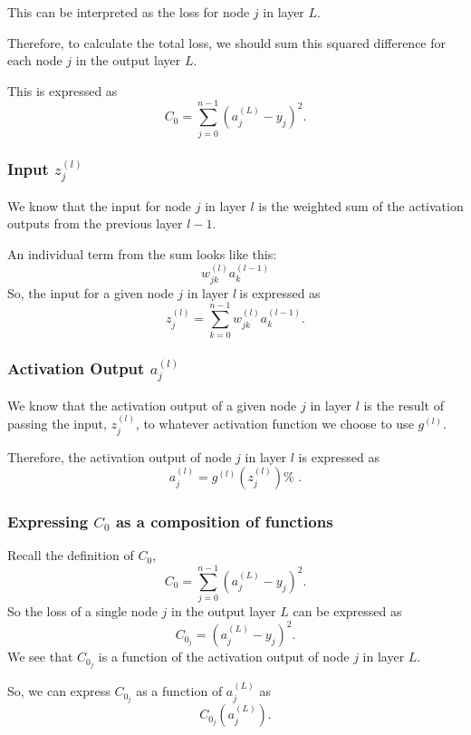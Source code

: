 \documentclass{article}
\begin{document}
This can be interpreted as the loss for node $j$ in layer $L$.

Therefore, to calculate the total loss, we should sum this squared
difference for each node $j$ in the output layer $L$.

This is expressed as%
\[
C_{0}=\sum_{j=0}^{n-1}\left( a_{j}^{(L)}-y_{j}\right) ^{2}\text{.} 
\]

\subsubsection{\protect\vspace{1pt}Input $z_{j}^{(l)}$}

We know that the input for node $j$ in layer $l$ is the weighted sum of the
activation outputs from the previous layer $l-1$.

An individual term from the sum looks like this:%
\[
w_{jk}^{(l)}a_{k}^{(l-1)} 
\]%
So, the input for a given node $j$ in layer $l\ $is expressed as 
\[
z_{j}^{(l)}=\sum_{k=0}^{n-1}w_{jk}^{(l)}a_{k}^{(l-1)}\text{.} 
\]

\subsubsection{Activation Output $a_{j}^{(l)}$}

We know that the activation output of a given node $j$ in layer $l$ is the
result of passing the input, $z_{j}^{\left( l\right) }$, to whatever
activation function we choose to use $g^{\left( l\right) }$.

Therefore, the activation output of node $j$ in layer $l$ is expressed as 
\[
a_{j}^{(l)}=g^{\left( l\right) }\left( z_{j}^{\left( l\right) }\right) \text{%
.} 
\]

\subsubsection{Expressing $C_{0}$ as a composition of functions}

Recall the definition of $C_{0}$,%
\[
C_{0}=\sum_{j=0}^{n-1}\left( a_{j}^{(L)}-y_{j}\right) ^{2}\text{.} 
\]%
So the loss of a single node $j$ in the output layer $L$ can be expressed as%
\[
C_{0_{j}}=\left( a_{j}^{(L)}-y_{j}\right) ^{2}\text{.} 
\]%
We see that $C_{0_{j}}$ is a function of the activation output of node $j$
in layer $L$.

So, we can express $C_{0_{j}}$ as a function of $a_{j}^{\left( L\right) }$ as%
\[
C_{0_{j}}\left( a_{j}^{\left( L\right) }\right) \text{.} 
\]
\end{document}
